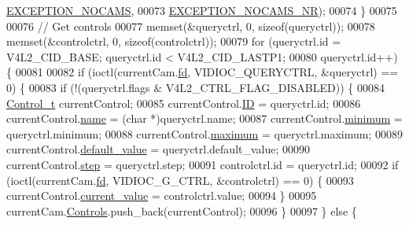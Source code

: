 \begin{DoxyCode}
      \hyperlink{_microscope_not_found_exception_8h_ab454d881077ad1b9fa1ff6a97af31e8a}{EXCEPTION\_NOCAMS},
00073                                              \hyperlink{_microscope_not_found_exception_8h_aea497321765f9a7c7cafc933aff14866}{EXCEPTION\_NOCAMS\_NR});
00074       \}
00075 
00076       \textcolor{comment}{// Get controls}
00077       memset(&queryctrl, 0, \textcolor{keyword}{sizeof}(queryctrl));
00078       memset(&controlctrl, 0, \textcolor{keyword}{sizeof}(controlctrl));
00079       \textcolor{keywordflow}{for} (queryctrl.id = V4L2\_CID\_BASE; queryctrl.id < V4L2\_CID\_LASTP1;
00080            queryctrl.id++) \{
00081 
00082         \textcolor{keywordflow}{if} (ioctl(currentCam.\hyperlink{struct_hardware_1_1_microscope_1_1_cam__t_ab8d692f05f97f5f3cc0401f750d9ad2e}{fd}, VIDIOC\_QUERYCTRL, &queryctrl) == 0) \{
00083           \textcolor{keywordflow}{if} (!(queryctrl.flags & V4L2\_CTRL\_FLAG\_DISABLED)) \{
00084             \hyperlink{struct_hardware_1_1_microscope_1_1_control__t}{Control\_t} currentControl;
00085             currentControl.\hyperlink{struct_hardware_1_1_microscope_1_1_control__t_a7eb33f4df690ac0f388be1305722576d}{ID} = queryctrl.id;
00086             currentControl.\hyperlink{struct_hardware_1_1_microscope_1_1_control__t_a7e6d24c2ba366a688ede19b4309dff66}{name} = (\textcolor{keywordtype}{char} *)queryctrl.name;
00087             currentControl.\hyperlink{struct_hardware_1_1_microscope_1_1_control__t_a3695825b54ec92981f3d9f7f5a6c6cac}{minimum} = queryctrl.minimum;
00088             currentControl.\hyperlink{struct_hardware_1_1_microscope_1_1_control__t_ac9b27cf29b495f9539931166cc3b41e2}{maximum} = queryctrl.maximum;
00089             currentControl.\hyperlink{struct_hardware_1_1_microscope_1_1_control__t_a6d10bf874987471188802081f0eb10f3}{default\_value} = queryctrl.default\_value;
00090             currentControl.\hyperlink{struct_hardware_1_1_microscope_1_1_control__t_a3151af96b23b2f4d536c74da12d81049}{step} = queryctrl.step;
00091             controlctrl.id = queryctrl.id;
00092             if (ioctl(currentCam.\hyperlink{struct_hardware_1_1_microscope_1_1_cam__t_ab8d692f05f97f5f3cc0401f750d9ad2e}{fd}, VIDIOC\_G\_CTRL, &controlctrl) == 0) \{
00093               currentControl.\hyperlink{struct_hardware_1_1_microscope_1_1_control__t_ac86486f4807d9c9e7fe75d1983b057d3}{current\_value} = controlctrl.value;
00094             \}
00095             currentCam.\hyperlink{struct_hardware_1_1_microscope_1_1_cam__t_ab86ea92620f15288753a980b6f5d6c9f}{Controls}.push\_back(currentControl);
00096           \}
00097         \} \textcolor{keywordflow}{else} \{

\end{DoxyCode}
